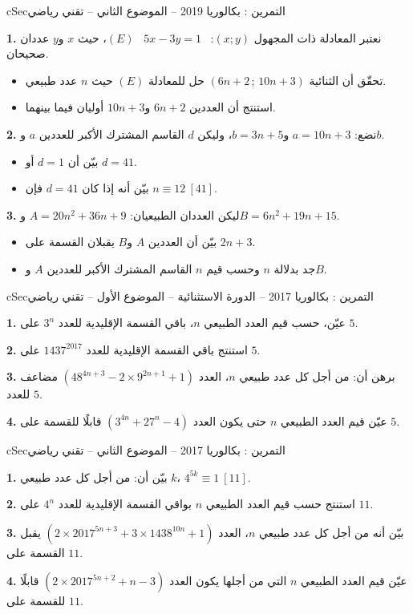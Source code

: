 \documentclass[12pt,a4paper]{article}
\newenvironment{BOX}[2]{\begin{otherlanguage}{english}\begin{arbox}{#1}{#2}}{\end{arbox}\end{otherlanguage}}
\newcounter{exo}
\newenvironment{tamrin}[1]{\stepcounter{exo}\begin{BOX}{cSec}{التمرين \theexo: #1}}{\end{BOX}}
\newenvironment{sq}{\begin{itemize}[leftmargin=2.4em,itemsep=3pt]}{\end{itemize}}
\newcommand{\qa}{\item[(أ)]}\newcommand{\qb}{\item[(ب)]}\newcommand{\qc}{\item[(جـ)]}\newcommand{\qd}{\item[(د)]}\newcommand{\qe}{\item[(هـ)]}
\newcommand{\QQ}[1]{\par\smallskip\textbf{#1.} }
\begin{document}
\begin{tamrin}{بكالوريا 2019 -- الموضوع الثاني -- تقني رياضي}
\QQ{1} نعتبر المعادلة ذات المجهول $(x;y)$: \ $5x-3y=1$ \ $(E)$، حيث $x$ و$y$ عددان صحيحان.
\begin{sq}
\qa تحقّق أن الثنائية $(6n+2\,;\,10n+3)$ حل للمعادلة $(E)$ حيث $n$ عدد طبيعي.
\qb استنتج أن العددين $6n+2$ و$10n+3$ أوليان فيما بينهما.
\end{sq}
\QQ{2} نضع: $a=10n+3$ و$b=3n+5$، وليكن $d$ القاسم المشترك الأكبر للعددين $a$ و$b$.
\begin{sq}
\qa بيّن أن $d=1$ أو $d=41$.
\qb بيّن أنه إذا كان $d=41$ فإن $n\equiv 12\ [41]$.
\end{sq}
\QQ{3} ليكن العددان الطبيعيان: $A=20n^2+36n+9$ و$B=6n^2+19n+15$.
\begin{sq}
\qa بيّن أن العددين $A$ و$B$ يقبلان القسمة على $2n+3$.
\qb جد بدلالة $n$ وحسب قيم $n$ القاسم المشترك الأكبر للعددين $A$ و$B$.
\end{sq}
\end{tamrin}

\begin{tamrin}{بكالوريا 2017 -- الدورة الاستثنائية -- الموضوع الأول -- تقني رياضي}
\QQ{1} عيّن، حسب قيم العدد الطبيعي $n$، باقي القسمة الإقليدية للعدد $3^n$ على $5$.
\QQ{2} استنتج باقي القسمة الإقليدية للعدد $1437^{2017}$ على $5$.
\QQ{3} برهن أن: من أجل كل عدد طبيعي $n$، العدد $\left(48^{4n+3}-2\times 9^{2n+1}+1\right)$ مضاعف للعدد $5$.
\QQ{4} عيّن قيم العدد الطبيعي $n$ حتى يكون العدد $\left(3^{4n}+27^n-4\right)$ قابلًا للقسمة على $5$.
\end{tamrin}

\begin{tamrin}{بكالوريا 2017 -- الموضوع الثاني -- تقني رياضي}
\QQ{1} بيّن أن: من أجل كل عدد طبيعي $k$، $4^{5k}\equiv 1\ [11]$.
\QQ{2} استنتج حسب قيم العدد الطبيعي $n$ بواقي القسمة الإقليدية للعدد $4^n$ على $11$.
\QQ{3} بيّن أنه من أجل كل عدد طبيعي $n$، العدد $\left(2\times 2017^{5n+3}+3\times 1438^{10n}+1\right)$ يقبل القسمة على $11$.
\QQ{4} عيّن قيم العدد الطبيعي $n$ التي من أجلها يكون العدد $\left(2\times 2017^{5n+2}+n-3\right)$ قابلًا للقسمة على $11$.
\end{tamrin}
\end{document}
